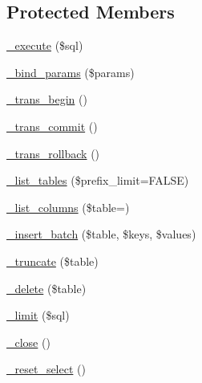 \subsection*{Protected Members}
\begin{DoxyCompactItemize}
\item 
\mbox{\hyperlink{class_c_i___d_b__oci8__driver_a114ab675d89bf8324a41785fb475e86d}{\+\_\+execute}} (\$sql)
\item 
\mbox{\hyperlink{class_c_i___d_b__oci8__driver_a66b8b06dadf7ff16c3877d5c024f5d2b}{\+\_\+bind\+\_\+params}} (\$params)
\item 
\mbox{\hyperlink{class_c_i___d_b__oci8__driver_ac81ac882c1d54347d810199a15856aac}{\+\_\+trans\+\_\+begin}} ()
\item 
\mbox{\hyperlink{class_c_i___d_b__oci8__driver_a6fe7f373e0b11cfae23a5f41c0b35dda}{\+\_\+trans\+\_\+commit}} ()
\item 
\mbox{\hyperlink{class_c_i___d_b__oci8__driver_ad49a116b0776c26b53114c9093fd102a}{\+\_\+trans\+\_\+rollback}} ()
\item 
\mbox{\hyperlink{class_c_i___d_b__oci8__driver_a435c0f3ce54fe7daa178baa8532ebd54}{\+\_\+list\+\_\+tables}} (\$prefix\+\_\+limit=F\+A\+L\+SE)
\item 
\mbox{\hyperlink{class_c_i___d_b__oci8__driver_a7ccb7f9c301fe7f0a9db701254142b63}{\+\_\+list\+\_\+columns}} (\$table=\textquotesingle{}\textquotesingle{})
\item 
\mbox{\hyperlink{class_c_i___d_b__oci8__driver_a1978e1358c812587a46e242630365099}{\+\_\+insert\+\_\+batch}} (\$table, \$keys, \$values)
\item 
\mbox{\hyperlink{class_c_i___d_b__oci8__driver_aa029600528fc1ce660a23ff4b4667f95}{\+\_\+truncate}} (\$table)
\item 
\mbox{\hyperlink{class_c_i___d_b__oci8__driver_a133ea8446ded52589bd22cc9163d0896}{\+\_\+delete}} (\$table)
\item 
\mbox{\hyperlink{class_c_i___d_b__oci8__driver_a3a02ea06541b8ecc25a33a61651562c8}{\+\_\+limit}} (\$sql)
\item 
\mbox{\hyperlink{class_c_i___d_b__oci8__driver_a4d9082658000e5ede8312067c6dda9db}{\+\_\+close}} ()
\item 
\mbox{\hyperlink{class_c_i___d_b__oci8__driver_a7c6cc16411b9c36fbfd42a9317f64317}{\+\_\+reset\+\_\+select}} ()
\end{DoxyCompactItemize}

